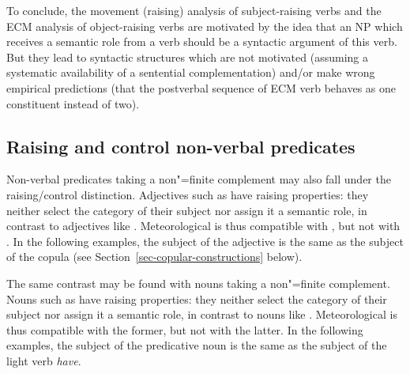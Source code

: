 To conclude, the movement (raising) analysis of subject-raising verbs and the ECM analysis of object-raising verbs are motivated by the idea that an NP which receives a semantic role from a verb should be a syntactic argument of this verb.
But they lead to syntactic structures which are not motivated (assuming a systematic availability of a sentential complementation) and/or make wrong empirical predictions (that the postverbal sequence of ECM verb behaves as one constituent instead of two).
 
\subsection{Raising and control non-verbal predicates}\label{nonverbal}

Non-verbal predicates taking a non"=finite complement may also fall under the raising/control distinction.  Adjectives such as  have raising properties: they neither select the category of their subject nor assign it a semantic role, in contrast to adjectives like . Meteorological  is thus compatible with , but not with . In the following examples, the subject of the adjective is the same as the subject of the copula (see Section~\ref{sec-copular-constructions} below).

\eal
{}
\zl

The same contrast may be found with  nouns taking a non"=finite complement. Nouns such as  have raising properties: they neither select the category of their subject nor assign it a semantic role, in contrast to nouns like . Meteorological  is thus compatible with the former, but not with the latter. In the following examples, the subject of the predicative noun is the same as the subject of the light verb \emph{have}.


